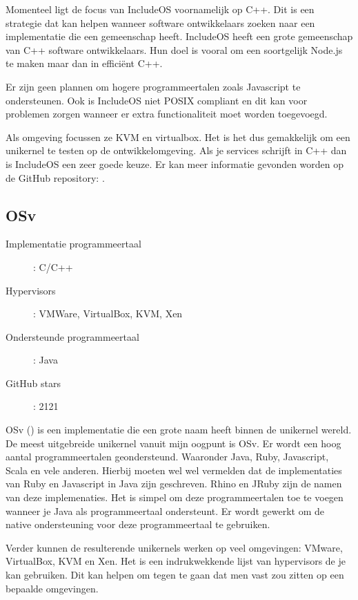 \documentclass[pdftex,a4paper,12pt,twoside]{report}
\begin{document}
Momenteel ligt de focus van IncludeOS voornamelijk op C++. Dit is een strategie dat kan helpen wanneer software ontwikkelaars zoeken naar een implementatie die een gemeenschap heeft. IncludeOS heeft een grote gemeenschap van C++ software ontwikkelaars. Hun doel is vooral om een soortgelijk Node.js te maken maar dan in efficiënt C++.

Er zijn geen plannen om hogere programmeertalen zoals Javascript te ondersteunen. Ook is IncludeOS niet POSIX compliant en dit kan voor problemen zorgen wanneer er extra functionaliteit moet worden toegevoegd.

Als omgeving focussen ze KVM en virtualbox. Het is het dus gemakkelijk om een unikernel te testen op de ontwikkelomgeving. Als je services schrijft in C++ dan is IncludeOS een zeer goede keuze. Er kan meer informatie gevonden worden op de GitHub repository: \cite{oslo_and_akershus_university_college_hioa-cs/includeos_????}.

\subsection{OSv}

\begin{description}
  \item [Implementatie programmeertaal]: C/C++
  \item [Hypervisors]: VMWare, VirtualBox, KVM, Xen
  \item [Ondersteunde programmeertaal]: Java
  \item [GitHub stars]: 2121
\end{description}

OSv (\cite{cloudius-systems/osv_0000}) is een implementatie die een grote naam heeft binnen de unikernel wereld. De meest uitgebreide unikernel vanuit mijn oogpunt is OSv. Er wordt een hoog aantal programmeertalen geondersteund. Waaronder Java, Ruby, Javascript, Scala en vele anderen. Hierbij moeten wel wel vermelden dat de implementaties van Ruby en Javascript in Java zijn geschreven. Rhino en JRuby zijn de namen van deze implemenaties. Het is simpel om deze programmeertalen toe te voegen wanneer je Java als programmeertaal ondersteunt. Er wordt gewerkt om de native ondersteuning voor deze programmeertaal te gebruiken.

Verder kunnen de resulterende unikernels werken op veel omgevingen: VMware, VirtualBox, KVM en Xen. Het is een indrukwekkende lijst van hypervisors de je kan gebruiken. Dit kan helpen om tegen te gaan dat men vast zou zitten op een bepaalde omgevingen.
\end{document}
